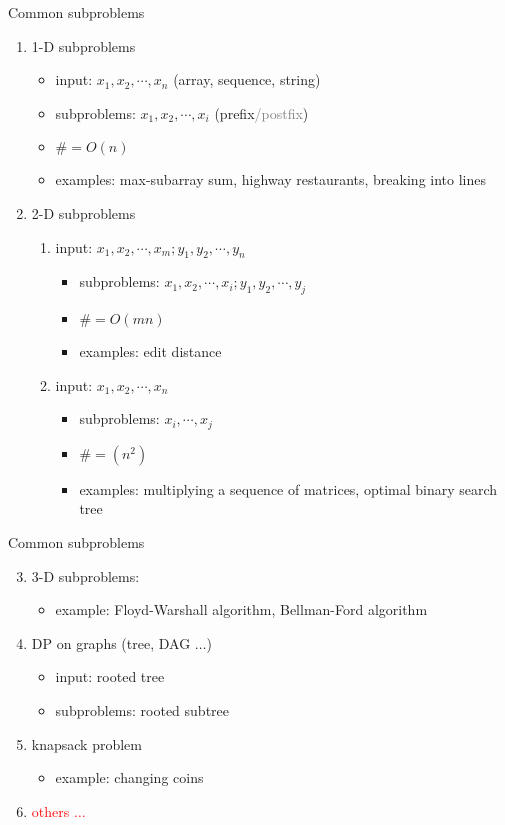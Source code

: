\begin{frame}{Common subproblems}
  \begin{enumerate}
    \item 1-D subproblems 
      \begin{itemize}
	\item input: $x_{1}, x_{2}, \cdots, x_{n}$ (array, sequence, string)
	\item subproblems: $x_{1}, x_{2}, \cdots, x_{i}$ (prefix\textcolor{gray}{/postfix})
	\item $\# = O(n)$
	\item examples: max-subarray sum, highway restaurants, breaking into lines
      \end{itemize}
    \item 2-D subproblems
      \begin{enumerate}
	\item input: $x_{1}, x_{2}, \cdots, x_{m}; y_{1}, y_{2}, \cdots, y_{n}$
	\begin{itemize}
	  \item subproblems: $x_{1}, x_{2}, \cdots, x_{i}; y_{1}, y_{2}, \cdots, y_{j}$
	  \item $\# = O(mn)$
	  \item examples: edit distance
	\end{itemize}
	\item input: $x_{1}, x_{2}, \cdots, x_{n}$
	\begin{itemize}
	  \item subproblems: $x_{i}, \cdots, x_{j}$
	  \item $\# = (n^{2})$
	  \item examples: multiplying a sequence of matrices, optimal binary search tree
	\end{itemize}
      \end{enumerate}
  \end{enumerate}
\end{frame}
\begin{frame}{Common subproblems}
  \begin{enumerate}
    \setcounter{enumi}{2}
    \item 3-D subproblems:
      \begin{itemize}
	\item example: Floyd-Warshall algorithm, Bellman-Ford algorithm
      \end{itemize}
    \item DP on graphs (tree, DAG $\ldots$)
      \begin{itemize}
	\item input: rooted tree
	\item subproblems: rooted subtree
      \end{itemize}
    \item knapsack problem
      \begin{itemize}
	\item example: changing coins
      \end{itemize}
    \item \textcolor{red}{others $\ldots$}
  \end{enumerate}
\end{frame}
